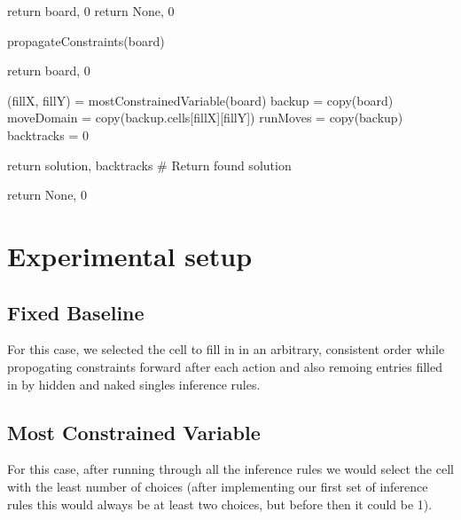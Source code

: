 \documentclass{article}
\begin{document}
\begin{algorithm}
  \begin{algorithmic}
    \State return board, 0  
  \EndIf
    \State return None, 0   
  \EndIf
       
  \State propagateConstraints(board)

    \State return board, 0   
  \EndIf
  

  \State (fillX, fillY) = mostConstrainedVariable(board)
  \State backup = copy(board)
  \State moveDomain = copy(backup.cells[fillX][fillY])
  \State runMoves = copy(backup)
  \State backtracks = 0



      \EndIf



      \EndIf



      \State return solution, backtracks  # Return found solution
      \EndIf

      \EndFor
  \State return None, 0           
    
         \end{algorithmic}
 \label{alg:Backtracking Search}
 

 
 

\section{Experimental setup}
\subsection{Fixed  Baseline}
For this case, we selected the  cell to fill in in an arbitrary, consistent order while propogating constraints forward after each action and also remoing entries filled in by hidden and naked singles inference rules. 
\subsection{Most Constrained Variable}
For this case, after running through all the inference rules we would select the cell with the least number of choices (after implementing our first set of inference rules this would always be at least two choices, but before then it could be 1). 


\end{algorithm}
\end{document}
